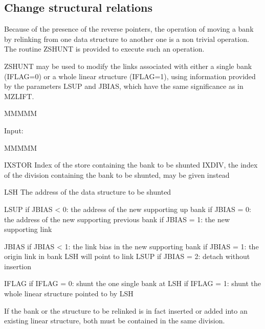 \subsection{Change structural relations}
\par Because of the presence of the reverse pointers,
the operation of moving a bank by relinking from one data structure
to another one is a non trivial operation.
The routine ZSHUNT is provided to execute such an operation.
\par ZSHUNT may be used to modify the links associated with
either a single bank (IFLAG=0)
or a whole linear structure (IFLAG=1), using information provided
by the parameters
LSUP and JBIAS, which have the same significance as in MZLIFT.
\begin{DL}{MMMMM}
\item[Input:
]
\begin{DL}{MMMMM}
\item[IXSTOR
]Index of the store containing the bank to be shunted
\newline IXDIV, the index of the division containing
the bank to be shunted, may be given instead
\item[LSH
]The address of the data structure to be shunted
\item[LSUP
]if JBIAS < 0:  the address of the new supporting up bank
\newline if JBIAS = 0:  the address of the new supporting previous bank
\newline if JBIAS = 1:  the new supporting link
\item[JBIAS
]if JBIAS < 1:  the link bias in the new supporting bank
\newline if JBIAS = 1: the origin link in bank LSH will point to link LSUP
\newline if JBIAS = 2:  detach without insertion
\item[IFLAG
]if IFLAG = 0:  shunt the one single bank at LSH
\newline if IFLAG = 1:  shunt the whole linear structure pointed to by LSH
\end{DL}
\end{DL}
\par If the bank or the structure to be relinked is in fact inserted
or added into an existing linear structure,
both must be contained in the same division.
